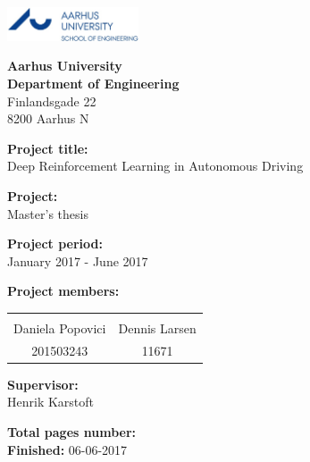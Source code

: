 \newpage
\mbox{}
\thispagestyle{empty}
\newpage


{}

\thispagestyle{empty}
\begin{minipage}[t]{0.48\textwidth}
	\vspace*{14pt}			%
	\vspace{1.2cm}
	\includegraphics[height=1cm]{Figures/au_ingenioerhoejskolen_en_logo.jpg} 
\end{minipage}
\hfill

\vspace*{1cm}

\begin{minipage}[t]{1\textwidth}
	
	{\small 
		\flushleft
		\textbf{Aarhus University}\\
		\textbf{Department of Engineering}  \\
		Finlandsgade 22 \\
		8200 Aarhus N \\
	}
	
	\vspace*{1cm}
	
	\textbf{Project title:} \\[5pt]\bigskip\hspace{2ex}
	Deep Reinforcement Learning in Autonomous Driving
	
	\textbf{Project:} \\[5pt]\bigskip\hspace{2ex}
	Master's thesis
	
	\textbf{Project period:} \\[5pt]\bigskip\hspace{2ex}
	January 2017 - June 2017
	
	\textbf{Project members:} \\[5pt]\hspace*{2ex}
	\begin{table}[H]
		\begin{tabular}{c c}
			\underline{\phantom{mmmmmmmmmmmmmmmm}} & \underline{\phantom{mmmmmmmmmmmmmmmm}}  
			\\
			Daniela Popovici		& Dennis Larsen	
			\\
			201503243				& 11671												
		\end{tabular}
	\end{table}
	
	\textbf{Supervisor:} \\[5pt]\hspace*{2ex}
	Henrik Karstoft \\\hspace*{2ex}
	
	\textbf{Total pages number:} \pageref{LastPage} \\
	\textbf{Finished:} 06-06-2017
	\hfill
	\vfill
\end{minipage}

